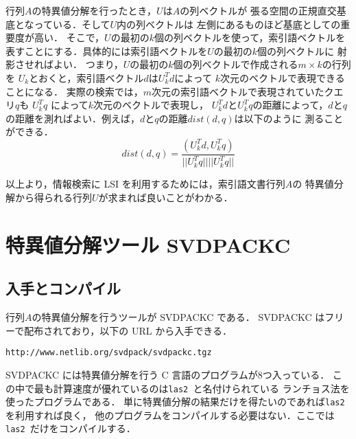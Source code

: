 行列\( A \)の特異値分解を行ったとき，\( U \)は\( A \)の列ベクトルが
張る空間の正規直交基底となっている．そして\( U \)内の列ベクトルは
左側にあるものほど基底としての重要度が高い．
そこで，\( U \)の最初の\( k \)個の列ベクトルを使って，索引語ベクトルを
表すことにする．具体的には索引語ベクトルを\( U \)の最初の\( k \)個の列ベクトルに
射影させればよい．
つまり，\( U \)の最初の\( k \)個の列ベクトルで作成される\( m \times k \)の行列を
\( U_k \)とおくと，索引語ベクトル\( d \)は\( U_{k}^{T} d \)によって
\( k \)次元のベクトルで表現できることになる．
実際の検索では，\( m \)次元の索引語ベクトルで表現されていたクエリ\( q \)も
\( U_{k}^{T} q \) によって\( k \)次元のベクトルで表現し，
\( U_{k}^{T} d \)と\( U_{k}^{T} q \)の距離によって，\( d \)と\( q \)
の距離を測ればよい．例えば，\( d \)と\( q \)の距離\( dist(d,q) \)は以下のように
測ることができる\cite{kita-ir}．
\begin{equation}
dist(d,q) = \frac{(U_{k}^{T} d, U_{k}^{T} q)}{||U_{k}^{T} q|| ||U_{k}^{T} q||} \label{siki2}
\end{equation}

以上より，情報検索に LSI を利用するためには，索引語文書行列\( A \)の
特異値分解から得られる行列\( U \)が求まれば良いことがわかる．


\section{特異値分解ツール SVDPACKC}


\subsection{入手とコンパイル}

行列\( A \)の特異値分解を行うツールが SVDPACKC である．
SVDPACKC はフリーで配布されており，以下の URL から入手できる．
\begin{center}
{\tt   http://www.netlib.org/svdpack/svdpackc.tgz}
\end{center}

SVDPACKC には特異値分解を行う C 言語のプログラムが8つ入っている．
この中で最も計算速度が優れているのは{\tt las2 }と名付けられている
ランチョス法\cite{kita-ir}を使ったプログラムである．
単に特異値分解の結果だけを得たいのであれば{\tt las2 }を利用すれば良く，
他のプログラムをコンパイルする必要はない．ここでは {\tt las2 }だけをコンパイルする．

